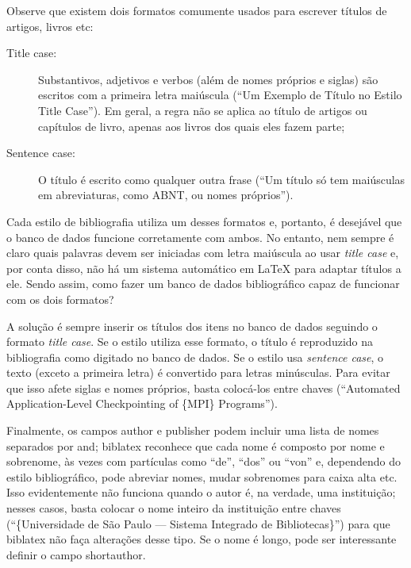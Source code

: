 Observe que existem dois formatos comumente usados para escrever títulos
de artigos, livros etc:

\begin{description}
  \item[Title case:] Substantivos, adjetivos e verbos (além de nomes
  próprios e siglas) são escritos com a primeira letra maiúscula (``Um
  Exemplo de Título no Estilo Title Case''). Em geral, a regra não se
  aplica ao título de artigos ou capítulos de livro, apenas aos livros
  dos quais eles fazem parte;

  \item[Sentence case:] O título é escrito como qualquer outra frase
  (``Um título só tem maiúsculas em abreviaturas, como ABNT, ou nomes
  próprios'').
\end{description}

Cada estilo de bibliografia utiliza um desses formatos e, portanto, é
desejável que o banco de dados funcione corretamente com ambos. No
entanto, nem sempre é claro quais palavras devem ser iniciadas com letra
maiúscula ao usar \emph{title case} e, por conta disso, não há um sistema
automático em \LaTeX{} para adaptar títulos a ele. Sendo assim, como fazer
um banco de dados bibliográfico capaz de funcionar com os dois formatos?

A solução é sempre inserir os títulos dos itens no banco de dados seguindo
o formato \emph{title case}. Se o estilo utiliza esse formato, o título
é reproduzido na bibliografia como digitado no banco de dados. Se o estilo
usa \emph{sentence case}, o texto (exceto a primeira letra) é convertido
para letras minúsculas. Para evitar que isso afete siglas e nomes próprios,
basta colocá-los entre chaves (``Automated Application-Level Checkpointing
of \{MPI\} Programs'').

\enlargethispage{\baselineskip}

Finalmente, os campos \textsf{author} e \textsf{publisher} podem incluir uma
lista de nomes separados por \textsf{and}; biblatex reconhece que cada nome é
composto por nome e sobrenome, às vezes com partículas como ``de'', ``dos''
ou ``von'' e, dependendo do estilo bibliográfico, pode abreviar nomes, mudar
sobrenomes para caixa alta etc. Isso evidentemente não funciona quando o autor
é, na verdade, uma instituição; nesses casos, basta colocar o nome inteiro da
instituição entre chaves (``\{Universidade de São Paulo --- Sistema Integrado
de Bibliotecas\}'') para que biblatex não faça alterações desse tipo. Se o
nome é longo, pode ser interessante definir o campo \textsf{shortauthor}.

